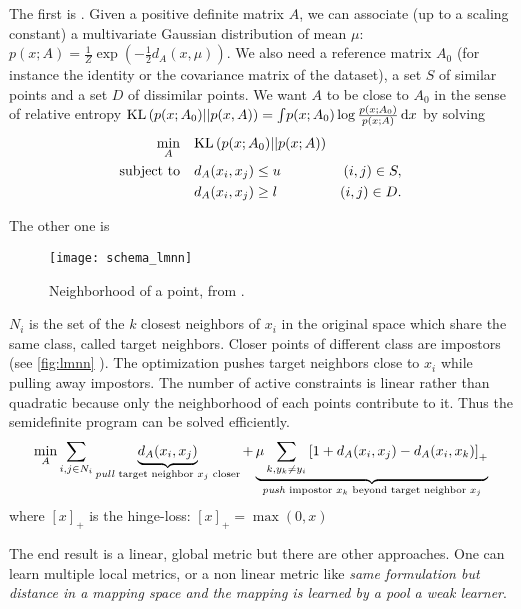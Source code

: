 The first is 
\autocite{InfoMetric07}. Given a positive definite matrix $A$, we can
associate (up to a scaling constant) a multivariate Gaussian distribution of
mean $\mu$: $p(x; A) = \frac{1}{Z}\exp\left(-\frac{1}{2}d_A(x, \mu)\right)$.
We also need a reference matrix $A_0$ (for instance the identity or the
covariance matrix of the dataset), a set $S$ of similar points and a set $D$
of dissimilar points. We want $A$ to be close to $A_0$ in the sense of
relative entropy $\mathrm{KL}\left(p(x; A_0)||p(x,A)\right) = \int \! p(x; A_0) \log\frac{p(x;
A_0)}{p(x; A)}\, \mathrm{d}x$ by solving
\begin{align*}
	\min_A &\quad \mathrm{KL}\left(p(x; A_0)||p(x; A)\right) &\quad\\
	\text{subject to} &\quad d_A(x_i, x_j) \leq u &(i,j) \in S,\\
			  &\quad d_A(x_i, x_j) \geq l &(i,j) \in D.
\end{align*}

The other one is  \autocite{LMNN09}
\begin{figure}[ht]
	\texttt{[image: schema\_lmnn]}
	\caption{Neighborhood of a point, from \autocite{LMNN09}.\label{fig:lmnn}}
\end{figure}
$N_i$ is the set of the $k$ closest neighbors of $x_i$ in the
original space which share the same class, called target neighbors. Closer
points of different class are impostors (see \autoref{fig:lmnn}
). The optimization pushes target neighbors close to $x_i$
while pulling away impostors.  The number of active constraints is linear
rather than quadratic because only the neighborhood of each points contribute
to it. Thus the semidefinite program can be solved efficiently.
\begin{equation}
	\min_A \sum_{i, j\in N_i}
	\underbrace{d_A(x_i, x_j)}_\text{\emph{pull} target neighbor $x_j$ closer} +
	\underbrace{\mu \sum_{k, y_k\neq y_i} \left[ 1 + d_A(x_i, x_j) -
	d_A(x_i, x_k)\right]_+}_\text{\emph{push} impostor $x_k$ beyond target
	neighbor $x_j$}
\end{equation}
where $[x]_+$ is the hinge-loss: $[x]_+=\max(0, x)$

The end result is a linear, global metric but there are other approaches. One
can learn multiple local metrics, or a non linear metric like
 \autocite{GBLMNN11} \emph{same formulation
but distance in a mapping space and the mapping is learned by a pool a weak
learner}.

